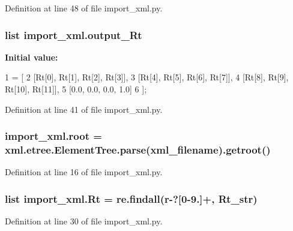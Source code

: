 Definition at line 48 of file import\+\_\+xml.\+py.

\subsubsection[{\texorpdfstring{output\+\_\+\+Rt}{output_Rt}}]{\setlength{\rightskip}{0pt plus 5cm}list import\+\_\+xml.\+output\+\_\+\+Rt}\hypertarget{namespaceimport__xml_ab25ba10cad6227b6b27a86882644dbce}{}\label{namespaceimport__xml_ab25ba10cad6227b6b27a86882644dbce}
{\bfseries Initial value\+:}
\begin{DoxyCode}
1 = [
2         [Rt[0], Rt[1], Rt[2], Rt[3]],
3         [Rt[4], Rt[5], Rt[6], Rt[7]],
4         [Rt[8], Rt[9], Rt[10], Rt[11]],
5         [0.0, 0.0, 0.0, 1.0]
6     ];
\end{DoxyCode}


Definition at line 41 of file import\+\_\+xml.\+py.

\subsubsection[{\texorpdfstring{root}{root}}]{\setlength{\rightskip}{0pt plus 5cm}import\+\_\+xml.\+root = xml.\+etree.\+Element\+Tree.\+parse({\bf xml\+\_\+filename}).getroot()}\hypertarget{namespaceimport__xml_a9ddb8ad46de8d0512c0c33ecc57e3dc8}{}\label{namespaceimport__xml_a9ddb8ad46de8d0512c0c33ecc57e3dc8}


Definition at line 16 of file import\+\_\+xml.\+py.

\subsubsection[{\texorpdfstring{Rt}{Rt}}]{\setlength{\rightskip}{0pt plus 5cm}list import\+\_\+xml.\+Rt = re.\+findall(r\textquotesingle{}-\/?\mbox{[}0-\/9.\mbox{]}+\textquotesingle{}, {\bf Rt\+\_\+str})}\hypertarget{namespaceimport__xml_a8ee934fa632e40193dea858cced805a1}{}\label{namespaceimport__xml_a8ee934fa632e40193dea858cced805a1}


Definition at line 30 of file import\+\_\+xml.\+py.

